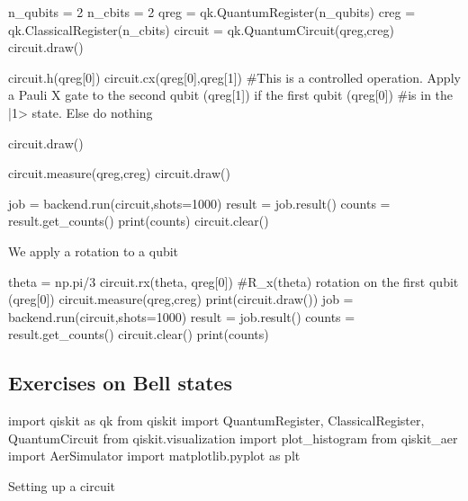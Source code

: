 \documentclass[%
oneside,                 %
final,                   %
10pt]{article}
\begin{document}
\bpycod
n_qubits = 2
n_cbits = 2
qreg = qk.QuantumRegister(n_qubits)
creg = qk.ClassicalRegister(n_cbits)
circuit = qk.QuantumCircuit(qreg,creg)
circuit.draw()



circuit.h(qreg[0])
circuit.cx(qreg[0],qreg[1]) 
#This is a controlled operation. Apply a Pauli X gate to the second qubit (qreg[1]) if the first qubit (qreg[0])
#is in the |1> state. Else do nothing

circuit.draw()

circuit.measure(qreg,creg)
circuit.draw()

\epycod








\bpycod
job = backend.run(circuit,shots=1000)
result = job.result()
counts = result.get_counts()
print(counts)
circuit.clear()

\epycod


We apply a rotation to a qubit











\bpycod
theta = np.pi/3
circuit.rx(theta, qreg[0]) #R_x(theta) rotation on the first qubit (qreg[0])
circuit.measure(qreg,creg)
print(circuit.draw())
job = backend.run(circuit,shots=1000)
result = job.result()
counts = result.get_counts()
circuit.clear()
print(counts)

\epycod


\subsection{Exercises on Bell states}







\bpycod
import qiskit as qk
from qiskit import QuantumRegister, ClassicalRegister, QuantumCircuit
from qiskit.visualization import plot_histogram
from qiskit_aer import AerSimulator
import matplotlib.pyplot as plt

\epycod


Setting up a circuit
\end{document}
